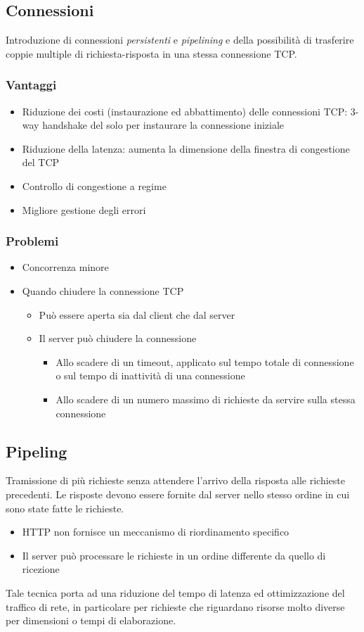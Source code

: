 \documentclass[a4paper,11pt]{article}
\begin{document}
\subsection{Connessioni}
Introduzione di connessioni \textit{persistenti} e \textit{pipelining} e della possibilità di trasferire coppie multiple di richiesta-risposta in una stessa connessione TCP.
\subsubsection{Vantaggi}
\begin{itemize}
    \item Riduzione dei costi (instaurazione ed abbattimento) delle connessioni TCP: 3-way handshake del solo per instaurare la connessione iniziale
    \item Riduzione della latenza: aumenta la dimensione della finestra di congestione del TCP
    \item Controllo di congestione a regime
    \item Migliore gestione degli errori
\end{itemize}
\subsubsection{Problemi}
\begin{itemize}
    \item Concorrenza minore
    \item Quando chiudere la connessione TCP
    \begin{itemize}
        \item Può essere aperta sia dal client che dal server
        \item Il server può chiudere la connessione
        \begin{itemize}
            \item Allo scadere di un timeout, applicato sul tempo totale di connessione o sul tempo di inattività di una connessione
            \item Allo scadere di un numero massimo di richieste da servire sulla stessa connessione
        \end{itemize}
    \end{itemize}
\end{itemize}
\subsection{Pipeling}
Tramissione di più richieste senza attendere l’arrivo della risposta alle richieste precedenti. Le risposte devono essere fornite dal server nello stesso ordine in cui sono state fatte le richieste.
\begin{itemize}
    \item HTTP non fornisce un meccanismo di riordinamento specifico
    \item Il server può processare le richieste in un ordine differente da quello di ricezione
\end{itemize}
Tale tecnica porta ad una riduzione del tempo di latenza ed ottimizzazione del traffico di rete, in particolare per richieste che riguardano risorse molto diverse per dimensioni o tempi di elaborazione.
\end{document}
